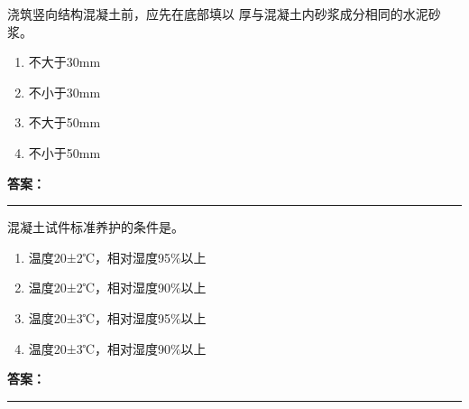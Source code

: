 \documentclass[UTF8,fontset=fandol,11pt]{ctexart}
\newcommand{\answerline}{\textcolor{answerred}{\rule{2.4cm}{0.7pt}}}
\begin{document}
\begin{quizbox}[title={乱序第 7 题｜第四章混凝土结构工程}]

浇筑竖向结构混凝土前，应先在底部填以 厚与混凝土内砂浆成分相同的水泥砂浆。\\

\begin{enumerate}[label=\Alph*.]

\item 不大于30mm

\item 不小于30mm

\item 不大于50mm

\item 不小于50mm

\end{enumerate}

\textbf{\textcolor{answerred}{答案：}} \answerline

\end{quizbox}

\vspace{0.2em}

\begin{quizbox}[title={乱序第 8 题｜第四章混凝土结构工程}]

混凝土试件标准养护的条件是。\\

\begin{enumerate}[label=\Alph*.]

\item 温度20±2℃，相对湿度95\%以上

\item 温度20±2℃，相对湿度90\%以上

\item 温度20±3℃，相对湿度95\%以上

\item 温度20±3℃，相对湿度90\%以上

\end{enumerate}

\textbf{\textcolor{answerred}{答案：}} \answerline

\end{quizbox}

\vspace{0.2em}
\end{document}
